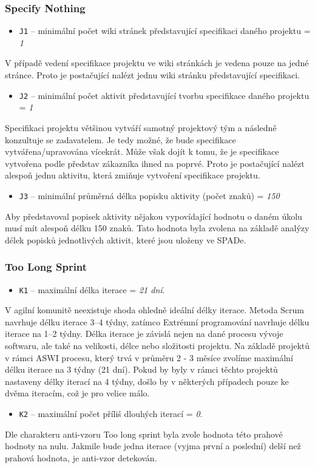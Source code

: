 \documentclass[czech,DP]{thesiskiv}
\begin{document}
\subsubsection{Specify Nothing}
\begin{itemize}
    \item \texttt{J1} -- minimální počet wiki stránek představující specifikaci daného projektu = \textit{1}
    \end{itemize}
V případě vedení specifikace projektu ve wiki stránkách je vedena pouze na jedné stránce. Proto je postačující nalézt jednu wiki stránku představující specifikaci.
    \begin{itemize}
    \item \texttt{J2} -- minimální počet aktivit představující tvorbu specifikace daného projektu = \textit{1}
    \end{itemize}
Specifikaci projektu většinou vytváří samotný projektový tým a následně konzultuje se zadavatelem. Je tedy možné, že bude specifikace vytvářena/upravována vícekrát. Může však dojít k tomu, že je specifikace vytvořena podle představ zákazníka ihned na poprvé. Proto je postačující nalézt alespoň jednu aktivitu, která zmiňuje vytvoření specifikace projektu.  
    \begin{itemize}
    \item \texttt{J3} -- minimální průměrná délka popisku aktivity (počet znaků) = \textit{150}
\end{itemize}
Aby představoval popisek aktivity nějakou vypovídající hodnotu o daném úkolu musí mít alespoň délku 150 znaků. Tato hodnota byla zvolena na základě analýzy délek popisků jednotlivých aktivit, které jsou uloženy ve SPADe.
\subsubsection{Too Long Sprint}
\begin{itemize}
    \item \texttt{K1} -- maximální délka iterace = \textit{21 dní}.
\end{itemize}
V agilní komunitě neexistuje shoda ohledně ideální délky iterace. Metoda Scrum navrhuje délku iterace 3–4 týdny, zatímco Extrémní programování navrhuje délku iterace na 1–2 týdny. \cite{sprint_length} Délka iterace je závislá nejen na dané procesu vývoje softwaru, ale také na velikosti, délce nebo složitosti projektu. Na základě projektů v rámci ASWI procesu, který trvá v průměru 2 - 3 měsíce zvolíme maximální délku iterace na 3 týdny (21 dní). Pokud by byly v rámci těchto projektů nastaveny délky iterací na 4 týdny, došlo by v některých případech pouze ke dvěma iteracím, což je pro velice málo.
\begin{itemize}
    \item \texttt{K2} -- maximální počet příliš dlouhých iterací = \textit{0}.
\end{itemize}
Dle charakteru anti-vzoru Too long sprint byla zvole hodnota této prahové hodnoty na nulu. Jakmile bude jedna iterace (vyjma první a poslední) delší než prahová hodnota, je anti-vzor detekován.
\end{document}
